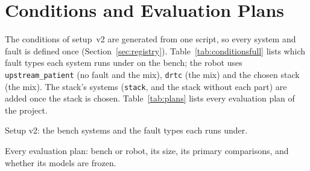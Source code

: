 \chapter{Conditions and Evaluation Plans}\label{app:conditions}

The conditions of setup~v2 are generated from one script, so every system and fault is defined once
(Section~\ref{sec:registry}). Table~\ref{tab:conditionsfull} lists which fault types each system runs under on the
bench; the robot uses \texttt{upstream\_patient} (no fault and the mix), \texttt{drtc} (the mix) and the chosen stack
(the mix). The stack's systems (\texttt{stack}, and the stack without each part) are added once the stack is chosen.
Table~\ref{tab:plans} lists every evaluation plan of the project.

\begin{table}[htbp]
  \centering
  \small
  \caption{Setup v2: the bench systems and the fault types each runs under.}\label{tab:conditionsfull}
\end{table}

\begin{table}[htbp]
  \centering
  \small
  \begin{adjustbox}{max width=\textwidth}
  \end{adjustbox}
  \caption{Every evaluation plan: bench or robot, its size, its primary comparisons, and whether its models are frozen.}\label{tab:plans}
\end{table}
